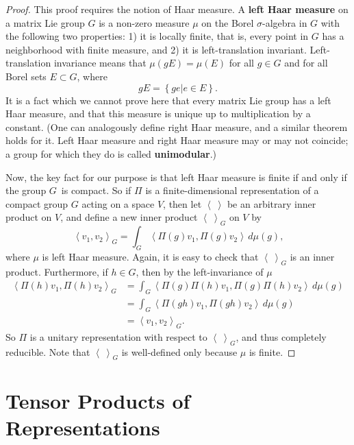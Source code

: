 \documentclass[12pt]{amsbook}
\theoremstyle{plain}
\numberwithin{equation}{chapter}
\numberwithin{theorem}{chapter}
\begin{document}
\begin{proof}
This proof requires the notion of Haar measure. A \textbf{left Haar measure}
on a matrix Lie group $G$ is a non-zero measure $\mu$ on the Borel $\sigma
$-algebra in $G$ with the following two properties: 1) it is locally finite,
that is, every point in $G$ has a neighborhood with finite measure, and 2) it
is left-translation invariant. Left-translation invariance means that
$\mu\left(  gE\right)  =\mu\left(  E\right)  $ for all $g\in G$ and for all
Borel sets $E\subset G$, where
\[
gE=\left\{  ge\left|  e\in E\right.  \right\}  \text{.}%
\]
It is a fact which we cannot prove here that every matrix Lie group has a left
Haar measure, and that this measure is unique up to multiplication by a
constant. (One can analogously define right Haar measure, and a similar
theorem holds for it. Left Haar measure and right Haar measure may or may not
coincide; a group for which they do is called \textbf{unimodular}.)

Now, the key fact for our purpose is that left Haar measure is finite if and
only if the group $G\,$ is compact. So if $\Pi$ is a finite-dimensional
representation of a compact group $G$ acting on a space $V$, then let
$\left\langle \ \right\rangle $ be an arbitrary inner product on $V$, and
define a new inner product $\left\langle \ \right\rangle _{G}$ on $V$ by
\[
\left\langle v_{1},v_{2}\right\rangle _{G}=\int_{G}\left\langle \Pi
(g)v_{1},\Pi(g)v_{2}\right\rangle \,d\mu\left(  g\right)  \text{,}%
\]
where $\mu$ is left Haar measure. Again, it is easy to check that
$\left\langle \ \right\rangle _{G}$ is an inner product. Furthermore, if $h\in
G$, then by the left-invariance of $\mu$
\begin{align*}
\left\langle \Pi(h)v_{1},\Pi(h)v_{2}\right\rangle _{G}  & =\int_{G}%
\left\langle \Pi(g)\Pi(h)v_{1},\Pi(g)\Pi(h)v_{2}\right\rangle \,d\mu\left(
g\right)  \\
& =\int_{G}\left\langle \Pi(gh)v_{1},\Pi(gh)v_{2}\right\rangle \,d\mu\left(
g\right)  \\
& =\left\langle v_{1},v_{2}\right\rangle _{G}\text{.}%
\end{align*}
So $\Pi$ is a unitary representation with respect to $\left\langle
\ \right\rangle _{G}$, and thus completely reducible. Note that $\left\langle
\ \right\rangle _{G}$ is well-defined only because $\mu$ is finite.
\end{proof}

\section{Tensor Products of Representations}
\end{document}
